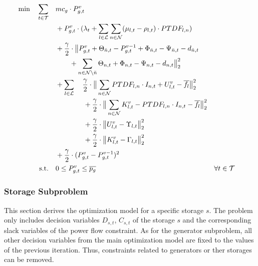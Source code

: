  \begin{subequations}
	\begin{align}
		 \min \quad \sum_{t\in\mathcal{T}} \quad & mc_g \cdot P_{g,t}^v \label{eq:sub:gen-final}\\
		 & + P_{g,t}^v \cdot (\lambda_t + \sum_{l \in \mathcal{L}} \sum_{n \in \mathcal{N}} (\mu_{l,t} - \rho_{l,t}) \cdot PTDF_{l,n}) \nonumber \\ 
		 & + \frac{\gamma}{2} \cdot \big\| P_{g,t}^v + \Theta_{\breve{n},t} - P_{g,t}^{v-1} + \Phi_{\breve{n},t} - \Psi_{\breve{n},t} - d_{\breve{n},t} \nonumber \\
		 & \qquad + \sum_{n \in \mathcal{N} \setminus \breve{n}} \Theta_{n,t} + \Phi_{n,t} - \Psi_{n,t} - d_{n,t} \big\|^2_2 \nonumber \\
		 & + \sum_{l \in \mathcal{L}} \quad \frac{\gamma}{2} \cdot \big\| \sum_{n \in \mathcal{N}} PTDF_{l,n} \cdot I_{n,t} + U_{l,t}^v - \overline{f_l} \big\|^2_2 \nonumber \\
		 & \qquad \qquad + \frac{\gamma}{2} \cdot \big\| \sum_{n \in \mathcal{N}} K_{l,t}^v - PTDF_{l,n} \cdot I_{n,t} - \overline{f_l} \big\|^2_2 \nonumber \\
		 & \qquad \qquad + \frac{\gamma}{2} \cdot \big\|U_{l,t}^v - \Upsilon_{l,t}  \big\|^2_2 \nonumber\\
		 & \qquad \qquad + \frac{\gamma}{2} \cdot \big\|K_{l,t}^v - \Gamma_{l,t}  \big\|^2_2 \nonumber \\
		 & + \frac{\gamma}{2} \cdot (P_{g,t}^v - P_{g,t}^{v-1})^2 \nonumber \\
		 \text{s.t.} \quad & 0 \leq P_{g,t}^v \leq \overline{p_g} && \forall t \in \mathcal{T}
	\end{align}
\end{subequations}

\subsubsection*{Storage Subproblem}

This section derives the optimization model for a specific storage $s$. The problem only includes decision variables $D_{s,t}$, $C_{s,t}$ of the storage $s$ and the corresponding slack variables of the power flow constraint. As for the generator subproblem, all other decision variables from the main optimization model are fixed to the values of the previous iteration. Thus, constraints related to generators or ther storages can be removed. \\

